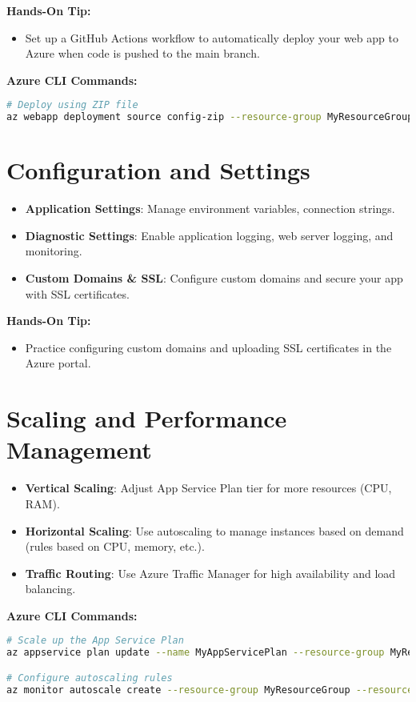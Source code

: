 \documentclass{article}
\begin{document}
\textbf{Hands-On Tip:}
\begin{itemize}
    \item Set up a GitHub Actions workflow to automatically deploy your web app to Azure when code is pushed to the main branch.
\end{itemize}

\textbf{Azure CLI Commands:}
\begin{lstlisting}[language=bash]
# Deploy using ZIP file
az webapp deployment source config-zip --resource-group MyResourceGroup --name MyUniqueAppName --src path/to/deploy.zip
\end{lstlisting}

\section{Configuration and Settings}
\begin{itemize}
    \item \textbf{Application Settings}: Manage environment variables, connection strings.
    \item \textbf{Diagnostic Settings}: Enable application logging, web server logging, and monitoring.
    \item \textbf{Custom Domains \& SSL}: Configure custom domains and secure your app with SSL certificates.
\end{itemize}

\textbf{Hands-On Tip:}
\begin{itemize}
    \item Practice configuring custom domains and uploading SSL certificates in the Azure portal.
\end{itemize}

\section{Scaling and Performance Management}
\begin{itemize}
    \item \textbf{Vertical Scaling}: Adjust App Service Plan tier for more resources (CPU, RAM).
    \item \textbf{Horizontal Scaling}: Use autoscaling to manage instances based on demand (rules based on CPU, memory, etc.).
    \item \textbf{Traffic Routing}: Use Azure Traffic Manager for high availability and load balancing.
\end{itemize}

\textbf{Azure CLI Commands:}
\begin{lstlisting}[language=bash]
# Scale up the App Service Plan
az appservice plan update --name MyAppServicePlan --resource-group MyResourceGroup --sku P1v2

# Configure autoscaling rules
az monitor autoscale create --resource-group MyResourceGroup --resource MyAppServicePlan --min-count 1 --max-count 3 --count 1
\end{lstlisting}
\end{document}
